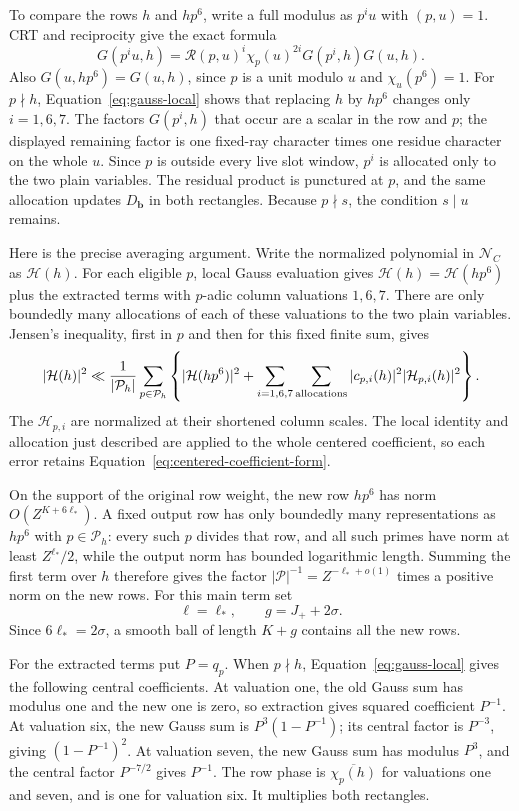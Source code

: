 \documentclass[12pt]{article}
\begin{document}
To compare the rows \(h\) and \(hp^6\), write a full modulus as \(p^iu\) with
\((p,u)=1\).  CRT and reciprocity give the exact formula
\[
 G(p^iu,h)
 =\mathcal R(p,u)^i\chi_p(u)^{2i}G(p^i,h)G(u,h).
\]
Also \(G(u,hp^6)=G(u,h)\), since \(p\) is a unit modulo \(u\)
and \(\chi_u(p^6)=1\).
For \(p\nmid h\), Equation~\eqref{eq:gauss-local} shows that
replacing \(h\) by \(hp^6\) changes only \(i=1,6,7\).
The factors \(G(p^i,h)\) that occur are a scalar in the row and
\(p\); the displayed remaining factor is one fixed-ray character
times one residue character on the whole \(u\).  Since \(p\) is
outside every live slot window, \(p^i\) is allocated only to the two
plain variables.  The residual product is punctured at \(p\), and
the same allocation updates \(D_{\mathbf b}\) in both rectangles.
Because \(p\nmid s\), the condition \(s\mid u\) remains.

Here is the precise averaging argument.  Write the normalized
polynomial in \(\mathcal N_C\) as \(\mathcal H(h)\).  For each
eligible \(p\), local Gauss evaluation gives
\(\mathcal H(h)=\mathcal H(hp^6)\) plus the extracted terms with
\(p\)-adic column valuations \(1,6,7\).  There are only boundedly
many allocations of each of these valuations to the two plain
variables.  Jensen's inequality, first in \(p\) and then for this
fixed finite sum, gives
\[
 |\mathcal H(h)|^2\ll
 \frac1{|\mathcal P_h|}\sum_{p\in\mathcal P_h}
 \left\{|\mathcal H(hp^6)|^2+
        \sum_{i=1,6,7}\sum_{\rm allocations}
        |c_{p,i}(h)|^2|\mathcal H_{p,i}(h)|^2\right\}.
\]
The \(\mathcal H_{p,i}\) are normalized at their shortened column
scales.  The local identity and allocation just described are applied to the
whole centered coefficient, so each error retains
Equation~\eqref{eq:centered-coefficient-form}.

On the support of the original row weight, the new row \(hp^6\)
has norm \(O(Z^{K+6\ell_*})\).  A fixed output row has only
boundedly many representations as \(hp^6\) with \(p\in\mathcal P_h\):
every such \(p\) divides that row, and all such primes have norm at
least \(Z^{\ell_*}/2\), while the output norm has bounded
logarithmic length.  Summing the first term over \(h\) therefore
gives the factor \(|\mathcal P|^{-1}=Z^{-\ell_*+o(1)}\)
times a positive norm on the new rows.  For this main term set
\[
 \ell=\ell_*,\qquad g=J_++2\sigma.
\]
Since \(6\ell_*=2\sigma\), a smooth ball of length \(K+g\)
contains all the new rows.

For the extracted terms put \(P=q_p\).  When \(p\nmid h\),
Equation~\eqref{eq:gauss-local} gives the following central
coefficients.  At valuation one, the old Gauss sum has modulus one
and the new one is zero, so extraction gives squared coefficient
\(P^{-1}\).  At valuation six, the new Gauss sum is
\(P^3(1-P^{-1})\); its central factor is \(P^{-3}\), giving
\((1-P^{-1})^2\).  At valuation seven, the new Gauss sum has
modulus \(P^3\), and the central factor \(P^{-7/2}\) gives
\(P^{-1}\).  The row phase is \(\overline{\chi_p(h)}\) for
valuations one and seven, and is one for valuation six.  It
multiplies both rectangles.
\end{document}
